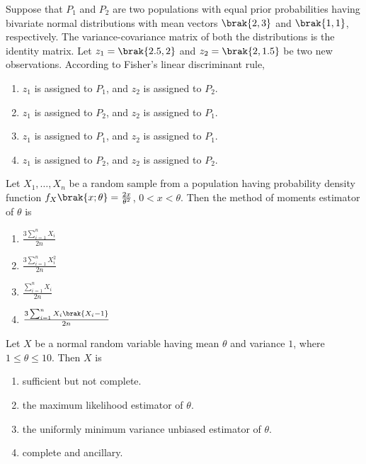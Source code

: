 \iffalse
\chapter{2019}
\section{st}
\author{ee24btech11018 - Durgi Swaraj Sharma}
\fi
	\item Suppose that $P_1$ and $P_2$ are two populations with equal prior probabilities having bivariate normal distributions with mean vectors $\brak{2, 3}$ and $\brak{1, 1}$, respectively. The variance-covariance matrix of both the distributions is the identity matrix. Let $z_1 = \brak{2.5, 2}$ and $z_2 = \brak{2, 1.5}$ be two new observations. According to Fisher's linear discriminant rule,
		\begin{enumerate}
			\item $z_1$ is assigned to $P_1$, and $z_2$ is assigned to $P_2$.
			\item $z_1$ is assigned to $P_2$, and $z_2$ is assigned to $P_1$.
			\item $z_1$ is assigned to $P_1$, and $z_2$ is assigned to $P_1$.
			\item $z_1$ is assigned to $P_2$, and $z_2$ is assigned to $P_2$.
		\end{enumerate}
	\item Let $ X_1, \dots, X_n $ be a random sample from a population having probability density function $ f_X\brak{x; \theta} = \frac{2x}{\theta^2} $, $ 0 < x < \theta $. Then the method of moments estimator of $ \theta $ is
		\begin{enumerate}
			\item $\frac{3 \sum_{i=1}^{n} X_i}{2n}$
			\item $\frac{3 \sum_{i=1}^{n} X^2_i}{2n}$
			\item $\frac{\sum_{i=1}^{n} X_i}{2n}$
			\item $\frac{3 \sum_{i=1}^{n} X_i\brak{X_i-1}}{2n}$
		\end{enumerate}
	\item Let $X$ be a normal random variable having mean $\theta$ and variance $1$, where $1 \leq \theta \leq 10$. Then $X$ is
		\begin{enumerate}
			\item sufficient but not complete.
			\item the maximum likelihood estimator of $\theta$.
			\item the uniformly minimum variance unbiased estimator of $\theta$.
			\item complete and ancillary.
		\end{enumerate}
